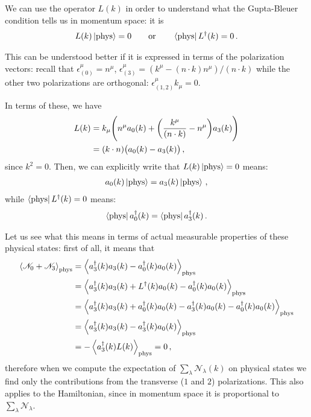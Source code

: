 \documentclass[main.tex]{subfiles}
\begin{document}
We can use the operator \(L(k)\) in order to understand what the Gupta-Bleuer condition tells us in momentum space: it is 
%
\begin{align}
L(k) \ket{\text{phys}} = 0 
\qquad \text{or} \qquad
\bra{\text{phys}} L ^\dag (k) = 0
\,.
\end{align}

This can be understood better if it is expressed in terms of the polarization vectors: recall that \(\epsilon^{\mu }_{(0)} = n^{\mu }\), \(\epsilon^{\mu }_{(3)} = (k^{\mu } - (n \cdot k) n^{\mu }) / (n \cdot k)\) while the other two polarizations are orthogonal: \(\epsilon^{\mu }_{(1, 2)} k_\mu =0 \). 

In terms of these, we have 
%
\begin{align}
L(k) &= k_{\mu } \qty(n^{\mu } a_0 (k) + \qty(\frac{k^{\mu }}{(n \cdot k)} - n^{\mu } ) a_3(k))   \\
&= (k \cdot n) \qty(a_0 (k ) - a_3 (k))
\,,
\end{align}
%
since \(k^2=0\). 
Then, we can explicitly write that \(L (k) \ket{\text{phys}} =0 \) means:
%
\begin{align}
a_0 (k) \ket{\text{phys}} = 
a_3 (k) \ket{\text{phys}} 
\,,
\end{align}
%
while \(\bra{\text{phys}} L ^\dag (k) = 0\) means:
%
\begin{align}
\bra{\text{phys}} a_0 ^\dag (k) = 
\bra{\text{phys}} a_3 ^\dag (k) 
\,.
\end{align}

Let us see what this means in terms of actual measurable properties of these physical states: first of all, it means that 
%
\begin{align}
\expval{\mathscr{N}_{0} + \mathscr{N}_{3}} _{\text{phys}} &= 
\expval{
    a ^\dag_{3} (k) a_3 (k ) - 
    a ^\dag_{0} (k) a_0 (k )
    }
_{\text{phys}}  \\
&= 
\expval{
    a ^\dag_{3} (k) a_3 (k ) +
    L ^\dag (k) a_0(k) -
    a ^\dag_{0} (k) a_0 (k )
    }
_{\text{phys}}   \\
&= 
\expval{
    a ^\dag_{3} (k) a_3 (k ) +
    a ^\dag_{0}(k) a_0(k) -
    a ^\dag_{3} (k) a_0 (k) - 
    a ^\dag_{0} (k) a_0 (k )
    }
_{\text{phys}}  \\
&= 
\expval{
    a ^\dag_{3} (k) a_3 (k ) -
    a ^\dag_{3} (k) a_0 (k) 
    }
_{\text{phys}}   \\
&= - \expval{
    a ^\dag_{3} (k) L(k)
    }
_{\text{phys}}  = 0
\,,
\end{align}
%
therefore when we compute the expectation of \(\sum _{\lambda } \mathscr{N}_{\lambda }(k)\) on physical states we find only the contributions from the transverse (\(1\) and \(2\)) polarizations. 
This also applies to the Hamiltonian, since in momentum space it is proportional to \(\sum _{\lambda } \mathscr{N}_{\lambda }\). 
\end{document}
